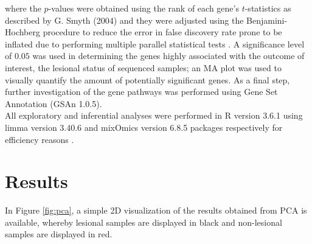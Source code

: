 \documentclass[journal, a4paper]{IEEEtran}
\begin{document}
\noindent where the $p$-values were obtained using the rank of each gene's $t$-statistics as described by G. Smyth (2004) and they were adjusted using the Benjamini-Hochberg procedure to reduce the error in false discovery rate prone to be inflated due to performing multiple parallel statistical tests \cite{smyth2004linear, benjamini2010discovering}. A significance level of $0.05$ was used in determining the genes highly associated with the outcome of interest, the lesional status of sequenced samples; an MA plot was used to visually quantify the amount of potentially significant genes. As a final step, further investigation of the gene pathways was performed using Gene Set Annotation (GSAn 1.0.5).\\

All exploratory and inferential analyses were performed in R version 3.6.1 using limma version 3.40.6 and mixOmics version 6.8.5 packages respectively for efficiency reasons \cite{rohart2017mixomics, smyth2005limma}.\\



\section{\textbf{Results}}

In Figure \ref{fig:pca}, a simple 2D visualization of the results obtained from PCA is available, whereby lesional samples are displayed in black and non-lesional samples are displayed in red.\\
\end{document}

